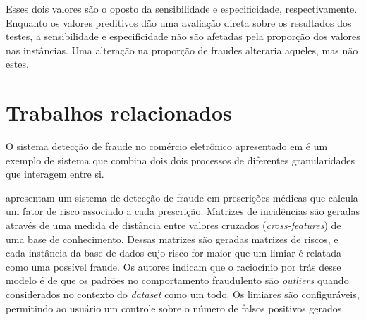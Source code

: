 Esses dois valores são o oposto da sensibilidade e especificidade, respectivamente. Enquanto os valores preditivos dão uma avaliação direta sobre os resultados dos testes, a sensibilidade e especificidade não são afetadas pela proporção dos valores nas instâncias. Uma alteração na proporção de fraudes alteraria aqueles, mas não estes.

\section{Trabalhos relacionados}

O sistema detecção de fraude no comércio eletrônico apresentado em \citet{Huang2010} é um exemplo de sistema que combina dois dois processos de diferentes granularidades que interagem entre si.

\citet{Aral2011} apresentam um sistema de detecção de fraude em prescrições médicas que calcula um fator de risco associado a cada prescrição. Matrizes de incidências são geradas através de uma medida de distância entre valores cruzados (\emph{cross-features}) de uma base de conhecimento. Dessas matrizes são geradas matrizes de riscos, e cada instância da base de dados cujo risco for maior que um limiar é relatada como uma possível fraude. Os autores indicam que o raciocínio por trás desse modelo é de que os padrões no comportamento fraudulento são \emph{outliers} quando considerados no contexto do \emph{dataset} como um todo. Os limiares são configuráveis, permitindo ao usuário um controle sobre o número de falsos positivos gerados.
